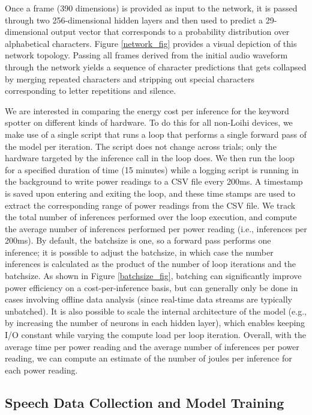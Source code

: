\documentclass{article}
\begin{document}
Once a frame (390 dimensions) is provided as input to the network, it is passed through two 256-dimensional hidden layers and then used to predict a 29-dimensional output vector that corresponds to a probability distribution over alphabetical characters. Figure \ref{network_fig} provides a visual depiction of this network topology. Passing all frames derived from the initial audio waveform through the network yields a sequence of character predictions that gets collapsed by merging repeated characters and stripping out special characters corresponding to letter repetitions and silence. 

We are interested in comparing the energy cost per inference for the keyword spotter on different kinds of hardware. To do this for all non-Loihi devices, we make use of a single script that runs a loop that performs a single forward pass of the model per iteration. The script does not change across trials; only the hardware targeted by the inference call in the loop does. We then run the loop for a specified duration of time (15 minutes) while a logging script is running in the background to write power readings to a CSV file every 200ms. A timestamp is saved upon entering and exiting the loop, and these time stamps are used to extract the corresponding range of power readings from the CSV file. We track the total number of inferences performed over the loop execution, and compute the average number of inferences performed per power reading (i.e., inferences per 200ms). By default, the batchsize is one, so a forward pass performs one inference; it is possible to adjust the batchsize, in which case the number inferences is calculated as the product of the number of loop iterations and the batchsize. As shown in Figure \ref{batchsize_fig}, batching can significantly improve power efficiency on a cost-per-inference basis, but can generally only be done in cases involving offline data analysis (since real-time data streams are typically unbatched). It is also possible to scale the internal architecture of the model (e.g., by increasing the number of neurons in each hidden layer), which enables keeping I/O constant while varying the compute load per loop iteration. Overall, with the average time per power reading and the average number of inferences per power reading, we can compute an estimate of the number of joules per inference for each power reading.

\subsection{Speech Data Collection and Model Training}
\end{document}
